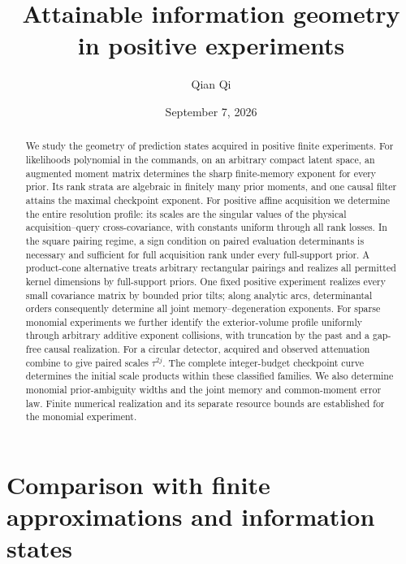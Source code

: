 \documentclass[11pt]{amsart}
\title[Attainable information geometry]{Attainable information geometry\\ in positive experiments}
\author{Qian Qi}
\date{September 7, 2026}
\theoremstyle{definition}\newtheorem{definition}[theorem]{Definition}
\theoremstyle{remark}\newtheorem{remark}[theorem]{Remark}
\begin{document}
\begin{abstract}
We study the geometry of prediction states acquired in positive finite
experiments. For likelihoods polynomial in the commands, on an arbitrary
compact latent space, an augmented moment matrix determines the sharp
finite-memory exponent for every prior. Its rank strata are algebraic
in finitely many prior moments, and one causal filter attains the maximal
checkpoint exponent. For positive affine acquisition we determine the
entire resolution profile: its scales are the singular values of the
physical acquisition--query cross-covariance, with constants uniform
through all rank losses. In the square pairing regime, a sign condition
on paired evaluation determinants is necessary and sufficient for full
acquisition rank under every full-support prior. A product-cone
alternative treats arbitrary rectangular pairings and realizes all
permitted kernel dimensions by full-support priors. One fixed positive
experiment realizes every small covariance matrix by bounded prior
tilts; along analytic arcs, determinantal orders consequently determine
all joint memory--degeneration exponents. For sparse monomial
experiments we further identify the exterior-volume profile uniformly
through arbitrary additive exponent collisions, with truncation by the
past and a gap-free causal realization. For a circular detector, acquired
and observed attenuation combine to give paired scales $\tau^{2j}$.
The complete integer-budget checkpoint curve determines the initial
scale products within these classified families. We also determine
monomial prior-ambiguity widths and the joint memory and common-moment
error law. Finite numerical realization and its separate resource bounds
are established for the monomial experiment.
\end{abstract}
\maketitle


















\appendix












\section{Comparison with finite approximations and information states}
\label{sec:literature-comparison}




\end{document}
